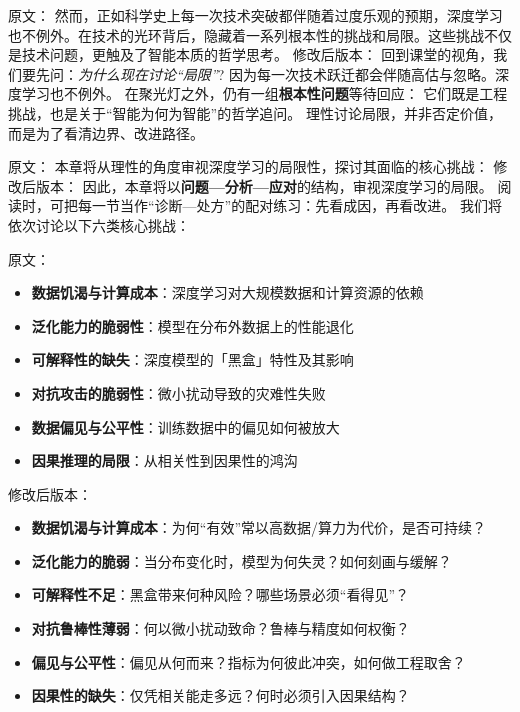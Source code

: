 原文：
然而，正如科学史上每一次技术突破都伴随着过度乐观的预期，深度学习也不例外。在技术的光环背后，隐藏着一系列根本性的挑战和局限。这些挑战不仅是技术问题，更触及了智能本质的哲学思考。
修改后版本：
回到课堂的视角，我们要先问：\textit{为什么现在讨论“局限”}?  
因为每一次技术跃迁都会伴随高估与忽略。深度学习也不例外。  
在聚光灯之外，仍有一组\textbf{根本性问题}等待回应：  
它们既是工程挑战，也是关于“智能为何为智能”的哲学追问。  
理性讨论局限，并非否定价值，而是为了看清边界、改进路径。

原文：
本章将从理性的角度审视深度学习的局限性，探讨其面临的核心挑战：
修改后版本：
因此，本章将以\textbf{问题—分析—应对}的结构，审视深度学习的局限。  
阅读时，可把每一节当作“诊断—处方”的配对练习：先看成因，再看改进。  
我们将依次讨论以下六类核心挑战：

原文：
\begin{itemize}
\item \textbf{数据饥渴与计算成本}：深度学习对大规模数据和计算资源的依赖
\item \textbf{泛化能力的脆弱性}：模型在分布外数据上的性能退化
\item \textbf{可解释性的缺失}：深度模型的「黑盒」特性及其影响
\item \textbf{对抗攻击的脆弱性}：微小扰动导致的灾难性失败
\item \textbf{数据偏见与公平性}：训练数据中的偏见如何被放大
\item \textbf{因果推理的局限}：从相关性到因果性的鸿沟
\end{itemize}
修改后版本：
\begin{itemize}
\item \textbf{数据饥渴与计算成本}：为何“有效”常以高数据/算力为代价，是否可持续？
\item \textbf{泛化能力的脆弱}：当分布变化时，模型为何失灵？如何刻画与缓解？
\item \textbf{可解释性不足}：黑盒带来何种风险？哪些场景必须“看得见”？
\item \textbf{对抗鲁棒性薄弱}：何以微小扰动致命？鲁棒与精度如何权衡？
\item \textbf{偏见与公平性}：偏见从何而来？指标为何彼此冲突，如何做工程取舍？
\item \textbf{因果性的缺失}：仅凭相关能走多远？何时必须引入因果结构？
\end{itemize}

